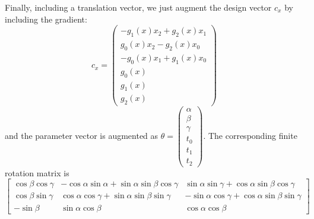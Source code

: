 \documentclass[11pt]{article}
\begin{document}
Finally, including a translation vector, we just augment the design vector $c_{x}$ by including the gradient:
\begin{equation}
	c_{x} = \left( \begin{array}{c}
		   -g_{1}(x)x_{2} + g_{2}(x)x_{1}\\
			g_{0}(x)x_{2} - g_{2}(x)x_{0}\\
		   -g_{0}(x)x_{1} + g_{1}(x)x_{0}\\
		    g_{0}(x)\\
		    g_{1}(x)\\
		    g_{2}(x)\end{array}\right)
\end{equation}
and the parameter vector is augmented as $\theta = \left( \begin{array}{c}
		   \alpha\\
		   \beta\\
		   \gamma\\
		   t_0\\
		   t_1\\
		   t_2\end{array}\right)$.
The corresponding finite rotation matrix is
\begin{displaymath}
	\left[ \begin{array}{ccc}
		   \cos{\beta} \cos{\gamma} & -\cos{\alpha}\sin{\alpha}+\sin{\alpha}\sin{\beta}\cos{\gamma} & \sin{\alpha}\sin{\gamma} + \cos{\alpha}\sin{\beta}\cos{\gamma}\\
		   \cos{\beta}\sin{\gamma} & \cos{\alpha}\cos{\gamma}+\sin{\alpha}\sin{\beta}\sin{\gamma} & -\sin{\alpha}\cos{\gamma} + \cos{\alpha}\sin{\beta}\sin{\gamma}\\
		   -\sin{\beta} & \sin{\alpha}\cos{\beta} & \cos{\alpha}\cos{\beta}
		   \end{array}\right]
\end{displaymath}
\end{document}
